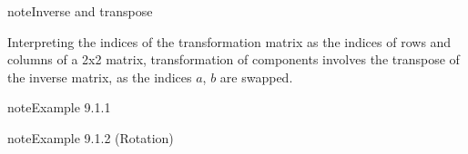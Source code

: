 \documentclass[letterpaper,10pt,english]{jupyterBook}
\begin{document}
\begin{sphinxadmonition}{note}{Inverse and transpose}

\sphinxAtStartPar
Interpreting the indices of the transformation matrix as the indices of rows and columns of a 2x2 matrix, transformation of components involves the transpose of the inverse matrix, as the indices \(a\), \(b\) are swapped.
\end{sphinxadmonition}
\label{ch/tensor-algebra-calculus/algebra:example-5}
\begin{sphinxadmonition}{note}{Example 9.1.1}


\end{sphinxadmonition}
\label{ch/tensor-algebra-calculus/algebra:example-6}
\begin{sphinxadmonition}{note}{Example 9.1.2 (Rotation)}




\end{sphinxadmonition}
\end{document}
